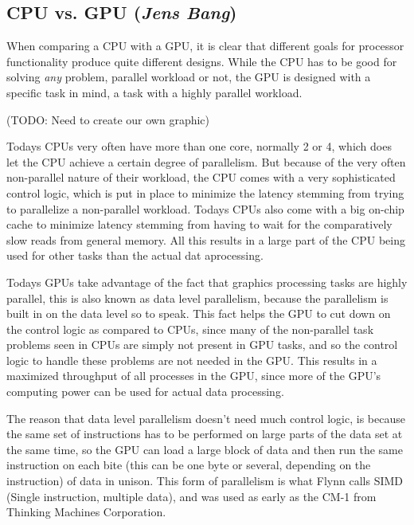 \subsection{CPU vs. GPU (\textit{Jens Bang})}
When comparing a CPU with a GPU, it is clear that different goals for processor functionality produce quite different designs. While the CPU has to be good for solving \emph{any} problem, parallel workload or not, the GPU is designed with a specific task in mind, a task with a highly parallel workload.


(TODO: Need to create our own graphic)

Todays CPUs very often have more than one core, normally 2 or 4, which does let the CPU achieve a certain degree of parallelism. But because of the very often non-parallel nature of their workload, the CPU comes with a very sophisticated control logic, which is put in place to minimize the latency stemming from trying to parallelize a non-parallel workload. Todays CPUs also come with a big on-chip cache to minimize latency stemming from having to wait for the comparatively slow reads from general memory. All this results in a large part of the CPU being used for other tasks than the actual dat aprocessing.

Todays GPUs take advantage of the fact that graphics processing tasks are highly parallel, this is also known as data level parallelism, because the parallelism is built in on the data level so to speak. This fact helps the GPU to cut down on the control logic as compared to CPUs, since many of the non-parallel task problems seen in CPUs are simply not present in GPU tasks, and so the control logic to handle these problems are not needed in the GPU. This results in a maximized throughput of all processes in the GPU, since more of the GPU's computing power can be used for actual data processing.

The reason that data level parallelism doesn't need much control logic, is because the same set of instructions has to be performed on large parts of the data set at the same time, so the GPU can load a large block of data and then run the same instruction on each bite (this can be one byte or several, depending on the instruction) of data in unison. This form of parallelism is what Flynn calls SIMD (Single instruction, multiple data), and was used as early as the CM-1 from Thinking Machines Corporation.

